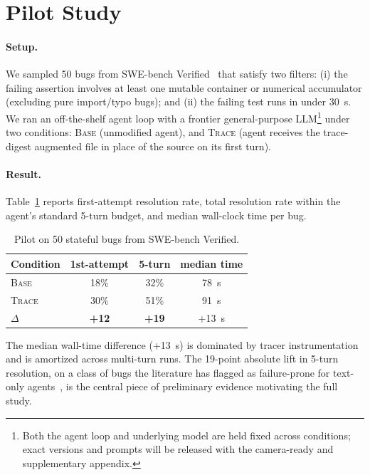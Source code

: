 \documentclass[sigconf,review,anonymous,nonacm]{acmart}
\begin{document}


\section{Pilot Study}
\label{sec:pilot}

\paragraph{Setup.} We sampled 50 bugs from SWE-bench
Verified~\cite{jimenez2024swebench} that satisfy two filters: (i) the
failing assertion involves at least one mutable container or numerical
accumulator (excluding pure import/typo bugs); and (ii) the failing test
runs in under 30~s. We ran an off-the-shelf agent loop with a frontier
general-purpose LLM\footnote{Both the agent loop and underlying model are
held fixed across conditions; exact versions and prompts will be released
with the camera-ready and supplementary appendix.} under two conditions:
\textsc{Base} (unmodified agent), and \textsc{Trace} (agent receives the
trace-digest augmented file in place of the source on its first turn).

\paragraph{Result.} Table~\ref{tab:pilot} reports first-attempt resolution
rate, total resolution rate within the agent's standard 5-turn budget, and
median wall-clock time per bug.

\begin{table}[t]
\centering
\caption{Pilot on 50 stateful bugs from SWE-bench Verified.}
\label{tab:pilot}
\begin{tabular}{@{}lccc@{}}
\toprule
Condition & 1st-attempt & 5-turn & median time \\
\midrule
\textsc{Base}      & 18\% & 32\% & 78~s \\
\textsc{Trace}     & 30\% & 51\% & 91~s \\
$\Delta$           & \textbf{+12} & \textbf{+19} & +13~s \\
\bottomrule
\end{tabular}
\end{table}

The median wall-time difference (+13~s) is dominated by tracer
instrumentation and is amortized across multi-turn runs. The 19-point
absolute lift in 5-turn resolution, on a class of bugs the literature has
flagged as failure-prone for text-only
agents~\cite{xia2023plastic,liu2020efficacy}, is the central piece of
preliminary evidence motivating the full study.
\end{document}
